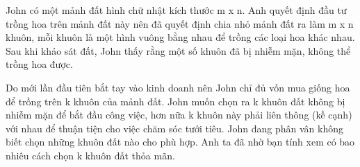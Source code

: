 John có một mảnh đất hình chữ nhật kích thước m x n. Anh quyết định đầu tư trồng hoa trên mảnh đất này nên đã quyết định chia nhỏ mảnh đất ra làm m x n khuôn, mỗi khuôn là một hình vuông bằng nhau để trồng các loại hoa khác nhau. Sau khi khảo sát đất, John thấy rằng một số khuôn đã bị nhiễm mặn, không thể trồng hoa được.  

   Do mới lần đầu tiên bắt tay vào kinh doanh nên John chỉ đủ vốn mua giống hoa để trồng trên k khuôn của mảnh đất. John muốn chọn ra k khuôn đất không bị nhiễm mặn để bắt đầu công việc, hơn nữa k khuôn này phải liên thông (kề cạnh) với nhau để thuận tiện cho việc chăm sóc tưới tiêu. John đang phân vân không biết chọn những khuôn đất nào cho phù hợp. Anh ta đã nhờ bạn tính xem có bao nhiêu cách chọn k khuôn đất thỏa mãn.  

\